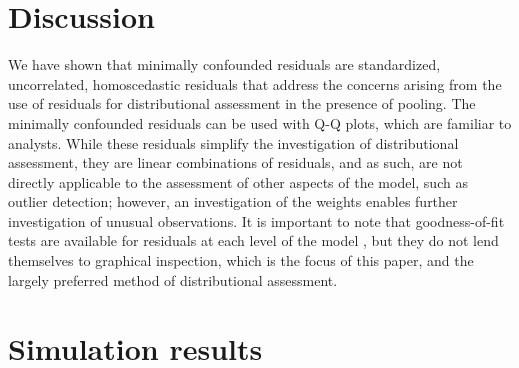 \documentclass{article} %
\newcommand{\trans}{\ensuremath{^\prime}}
\begin{document}
\section{Discussion}
We have shown that minimally confounded residuals are standardized, uncorrelated, homoscedastic residuals that address the concerns arising from the use of residuals for distributional assessment in the presence of pooling. The minimally confounded residuals can be used with Q-Q plots, which are familiar to analysts. While these residuals simplify the investigation of distributional assessment, they are linear combinations of residuals, and as such, are not directly applicable to the assessment of other aspects of the model, such as outlier detection; however, an investigation of the weights enables further investigation of unusual observations.
%
%
%
%
It is important to note that goodness-of-fit tests are available for residuals at each level of the model \citep{Jiang:2001up}, but they do not lend themselves to graphical inspection, which is the focus of this paper, and the largely preferred method of distributional assessment. 






\section*{Simulation results}

\end{document}
